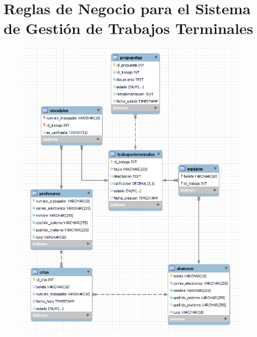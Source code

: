 \newpage

\section*{Reglas de Negocio para el Sistema de Gestión de Trabajos Terminales}
\begin{figure}[!h]
    \centering
    \includegraphics[scale = .87]{bd.png}
\end{figure}